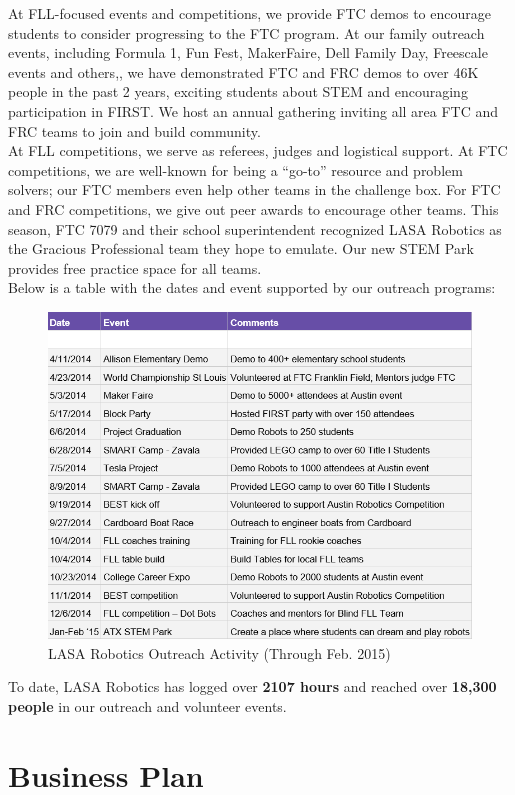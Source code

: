 At FLL-focused events and competitions, we provide FTC demos to encourage students to consider progressing to the FTC program. At our family outreach events, including Formula 1, Fun Fest, MakerFaire, Dell Family Day, Freescale events and others,, we have demonstrated  FTC and FRC demos to over 46K people in the past 2 years, exciting students about STEM and encouraging participation in FIRST. We host an annual gathering inviting all area FTC and FRC teams to join and build community.\\

At FLL competitions, we serve as referees, judges and logistical support. At FTC competitions, we are well-known for being a “go-to” resource and problem solvers; our FTC members even help other teams in the challenge box. For FTC and FRC competitions, we give out peer awards to encourage other teams. This season, FTC 7079 and their school superintendent recognized LASA Robotics as the Gracious Professional team they hope to emulate. Our new STEM Park provides free practice space for all teams.\\

Below is a table with the dates and event supported by our outreach programs:

\begin{figure}[h]
	\color{darkgray}
	\centering
	\includegraphics[height=0.6\linewidth]{outreach}
	\caption[]{LASA Robotics Outreach Activity (Through Feb. 2015)}
	\label{fig:reach}
\end{figure}

To date, LASA Robotics has logged over {\bf 2107 hours} and reached over {\bf 18,300 people} in our outreach and volunteer events.

\section{Business Plan}
